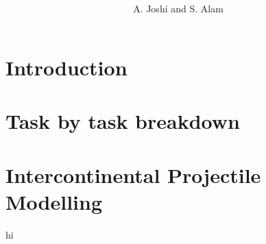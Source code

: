 \documentclass[a4paper,11pt]{article}
\title{\textbf{}}
\author{A. Joshi and S. Alam}
\date{}
\begin{document}
\maketitle

\begin{abstract}
\end{abstract}

\begin{multicols}{2}


\section{Introduction}

\section{Task by task breakdown}

\section{Intercontinental Projectile Modelling}

\newpage
hi \cite{handout}
\nocite{*}


\end{multicols}
\end{document}
